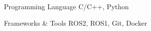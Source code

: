 

\begin{cvskills}

  \cvskill
    {Programming Language} %
    {C/C++, Python} %

  \cvskill
    {Frameworks \& Tools} %
    {ROS2, ROS1, Git, Docker} %

\end{cvskills}
